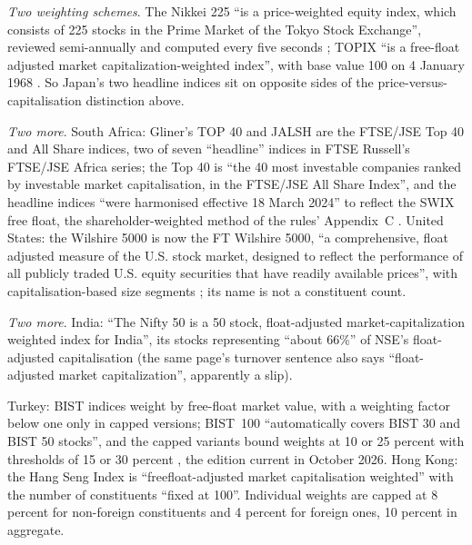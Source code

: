 \begin{qfdefinition}
\emph{Two weighting schemes}. The Nikkei 225 ``is a price-weighted equity index, which consists of 225 stocks in the Prime Market of the Tokyo Stock Exchange'', reviewed semi-annually and computed every five seconds \citep[profile page]{nikkei-225-profile}; TOPIX ``is a free-float adjusted market capitalization-weighted index'', with base value 100 on 4 January 1968 \citep[TOPIX page]{jpx-topix}. So Japan's two headline indices sit on opposite sides of the price-versus-capitalisation distinction above.

\emph{Two more}. South Africa: Gliner's TOP 40 and JALSH are the FTSE/JSE Top 40 and All Share indices, two of seven ``headline'' indices in FTSE Russell's FTSE/JSE Africa series; the Top 40 is ``the 40 most investable companies ranked by investable market capitalisation, in the FTSE/JSE All Share Index'', and the headline indices ``were harmonised effective 18 March 2024'' to reflect the SWIX free float, the shareholder-weighted method of the rules' Appendix~C \citep[v9.3, September 2026, secs.~1.7.1 and~4.5.1, pp.~4 and~13]{ftse-jse-ground-rules-2026}. United States: the Wilshire 5000 is now the FT Wilshire 5000, ``a comprehensive, float adjusted measure of the U.S. stock market, designed to reflect the performance of all publicly traded U.S. equity securities that have readily available prices'', with capitalisation-based size segments \citep[WI-METH-001, January 2026, sec.~1.1, p.~4]{ft-wilshire-5000-2026}; its name is not a constituent count.

\emph{Two more}. India: ``The Nifty 50 is a 50 stock, float-adjusted market-capitalization weighted index for India'', its stocks representing ``about 66\%'' of NSE's float-adjusted capitalisation \citep[Methodology Document for Equity Indices, September 2026, PDF p.~19]{nse-nifty-methodology-2026} (the same page's turnover sentence also says ``float-adjusted market capitalization'', apparently a slip).

Turkey: BIST indices weight by free-float market value, with a weighting factor below one only in capped versions; BIST~100 ``automatically covers BIST 30 and BIST 50 stocks'', and the capped variants bound weights at 10 or 25 percent with thresholds of 15 or 30 percent \citep[Ground Rules, April 2020, secs.~2.2--2.3, 2.20 and~3.1, pp.~1--5]{bist-ground-rules-2020}, the edition current in October 2026. Hong Kong: the Hang Seng Index is ``freefloat-adjusted market capitalisation weighted'' with the number of constituents ``fixed at 100''. Individual weights are capped at 8 percent for non-foreign constituents and 4 percent for foreign ones, 10 percent in aggregate.


\end{qfdefinition}
